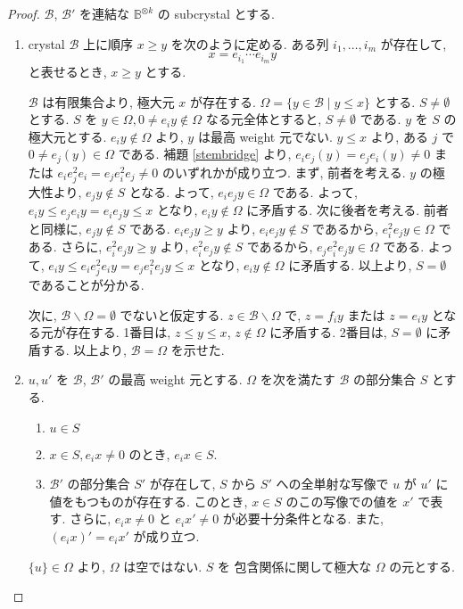 \documentclass[
  a4paper, 
  12pt,
  ja=standard,
  xelatex,
  left=30truemm,
  right=30truemm,
  titlepage 
]{bxjsarticle}
\theoremstyle{definition}
\begin{document}
\begin{proof}
  $\mathcal{B}$, $\mathcal{B}'$ を連結な $\mathbb{B}^{ \otimes k}$ の subcrystal とする.
  \begin{enumerate}
    \item
    crystal $\mathcal{B}$ 上に順序 $x \geq y$ を次のように定める.  
    ある列 $i_1, \dots, i_m$ が存在して,
    \[
    x = e_{i_1} \cdots e_{i_m} y
    \]
    と表せるとき, $x \geq y$ とする.

    $\mathcal{B}$ は有限集合より, 極大元 $x$ が存在する.
    $\Omega = \{ y \in \mathcal{B} \mid y \leq x \}$ とする.
    $S \neq \emptyset$ とする.
    $S$ を $y \in \Omega, 0 \neq e_i y \notin \Omega$ なる元全体とすると,
    $S \neq \emptyset$ である.
    $y$ を $S$ の極大元とする.
    $e_i y \notin \Omega$ より, $y$ は最高 weight 元でない.
    $y \leq x$ より, ある $j$ で $0 \neq e_j(y) \in \Omega$ である.
    補題 \ref{stembridge} より, $e_ie_j(y) = e_je_i(y) \neq 0$ または
    $e_ie_j^2e_i = e_je_i^2e_j \neq 0$ のいずれかが成り立つ.
    まず, 前者を考える.
    $y$ の極大性より, $e_jy \notin S$ となる.
    よって, $e_ie_jy \in \Omega$ である.
    よって, $e_iy \leq e_je_iy = e_ie_jy \leq x$ となり, $e_iy \notin \Omega$ に矛盾する.
    次に後者を考える.
    前者と同様に, $e_jy \notin S$ である.
    $e_ie_jy \geq y$ より, $e_ie_jy \notin S$ であるから,
    $e_i^2e_jy \in \Omega$ である.
    さらに, $e_i^2e_jy\geq y$ より, $e_i^2e_jy \notin S$ であるから,
    $e_je_i^2e_jy \in \Omega$ である.
    よって, $e_iy \leq e_ie_j^2e_iy = e_je_i^2e_jy \leq x$ となり, $e_iy \notin \Omega$ に矛盾する.
    以上より, $S = \emptyset$ であることが分かる.

    次に, $\mathcal{B} \backslash \Omega = \emptyset$ でないと仮定する.
    $z \in \mathcal{B} \backslash \Omega$ で, $z = f_iy$ または $z = e_iy$ となる元が存在する.
    1番目は, $z \leq y \leq x$, $z \notin \Omega$ に矛盾する.
    2番目は, $S = \emptyset$ に矛盾する.
    以上より, $\mathcal{B} = \Omega$ を示せた.
    \item 
    $u, u'$ を $\mathcal{B}$, $\mathcal{B}'$ の最高 weight 元とする.
    $\Omega$ を次を満たす $\mathcal{B}$ の部分集合 $S$ とする.
    \begin{enumerate}
      \item $u \in S$
      \item $x \in S, e_ix \neq 0$ のとき, $e_ix \in S$.
      \item $\mathcal{B}'$ の部分集合 $S'$ が存在して,
      $S$ から $S'$ への全単射な写像で $u$ が $u'$ に値をもつものが存在する.
      このとき, $x \in S$ のこの写像での値を $x'$ で表す.
      さらに, $e_ix \neq 0$ と $e_ix' \neq 0$ 
      が必要十分条件となる. また, $(e_ix)' = e_i x'$ が成り立つ.
    \end{enumerate}
    $\{ u \} \in \Omega$ より, $\Omega$ は空ではない.
    $S$ を 包含関係に関して極大な $\Omega$ の元とする.


\end{enumerate}
\end{proof}
\end{document}
